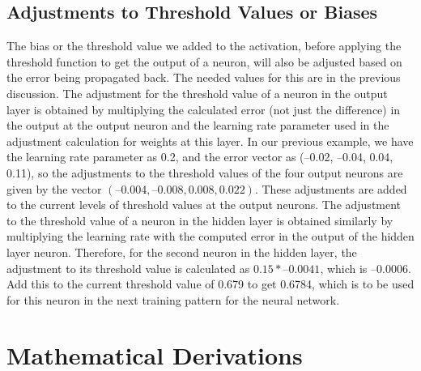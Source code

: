 \subsection{Adjustments to Threshold Values or Biases}
The bias or the threshold value we added to the activation, before applying the
threshold function to get the output of a neuron, will also be adjusted based on
the error being propagated back. The needed values for this are in the previous
discussion.
The adjustment for the threshold value of a neuron in the output layer is
obtained by multiplying the calculated error (not just the difference) in the
output at the output neuron and the learning rate parameter used in the
adjustment calculation for weights at this layer. In our previous example, we
have the learning rate parameter as 0.2, and the error vector as (–0.02, –0.04,
0.04, 0.11), so the adjustments to the threshold values of the four output
neurons are given by the vector $(–0.004, –0.008, 0.008, 0.022)$. These
adjustments are added to the current levels of threshold values at the output
neurons.
The adjustment to the threshold value of a neuron in the hidden layer is
obtained similarly by multiplying the learning rate with the computed error in
the output of the hidden layer neuron. Therefore, for the second neuron in the
hidden layer, the adjustment to its threshold value is calculated as $0.15 *
–0.0041$, which is $–0.0006$. Add this to the current threshold value of 0.679 to
get 0.6784, which is to be used for this neuron in the next training pattern for
the neural network.

\section{Mathematical Derivations}

